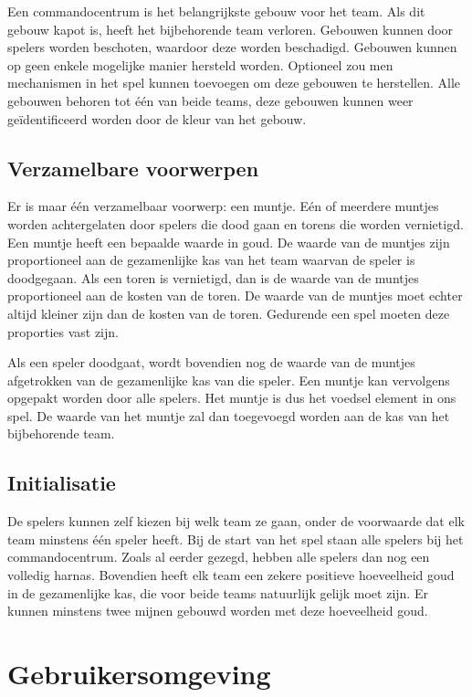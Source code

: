 Een commandocentrum is het belangrijkste gebouw voor het team. Als dit gebouw kapot is, heeft het bijbehorende team verloren. Gebouwen kunnen door spelers worden beschoten, waardoor deze worden beschadigd. Gebouwen kunnen op geen enkele mogelijke manier hersteld worden. Optioneel zou men mechanismen in het spel kunnen toevoegen om deze gebouwen te herstellen. Alle gebouwen behoren tot \'e\'en van beide teams, deze gebouwen kunnen weer ge\"identificeerd worden door de kleur van het gebouw.

\subsection{Verzamelbare voorwerpen}
Er is maar \'e\'en verzamelbaar voorwerp: een muntje. E\'en of meerdere muntjes worden achtergelaten door spelers die dood gaan en torens die worden vernietigd. Een muntje heeft een bepaalde waarde in goud. De waarde van de muntjes zijn proportioneel aan de gezamenlijke kas van het team waarvan de speler is doodgegaan. Als een toren is vernietigd, dan is de waarde van de muntjes proportioneel aan de kosten van de toren. De waarde van de muntjes moet echter altijd kleiner zijn dan de kosten van de toren. Gedurende een spel moeten deze proporties vast zijn.

Als een speler doodgaat, wordt bovendien nog de waarde van de muntjes afgetrokken van de gezamenlijke kas van die speler. Een muntje kan vervolgens opgepakt worden door alle spelers. Het muntje is dus het voedsel element in ons spel. De waarde van het muntje zal dan toegevoegd worden aan de kas van het bijbehorende team.

\subsection{Initialisatie}
De spelers kunnen zelf kiezen bij welk team ze gaan, onder de voorwaarde dat elk team minstens \'e\'en speler heeft. Bij de start van het spel staan alle spelers bij het commandocentrum. Zoals al eerder gezegd, hebben alle spelers dan nog een volledig harnas. Bovendien heeft elk team een zekere positieve hoeveelheid goud in de gezamenlijke kas, die voor beide teams natuurlijk gelijk moet zijn. Er kunnen minstens twee mijnen gebouwd worden met deze hoeveelheid goud.
\FloatBarrier

\section{Gebruikersomgeving}
\label{sec:UI}

